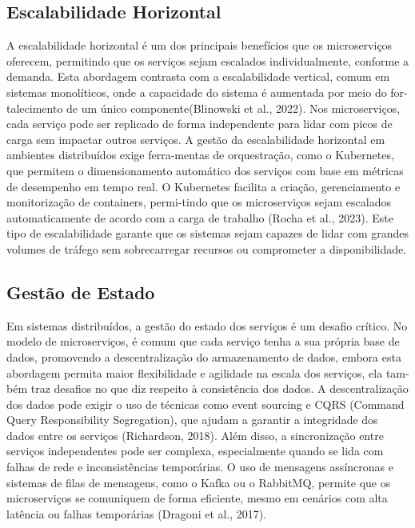 \subsection{Escalabilidade Horizontal}

A escalabilidade horizontal é um dos principais benefícios que os microserviços oferecem, permitindo que os serviços sejam escalados individualmente, conforme a demanda. Esta abordagem contrasta com a escalabilidade vertical, comum em sistemas monolíticos, onde a capacidade do sistema é aumentada por meio do for-talecimento de um único componente(Blinowski et al., 2022). Nos microserviços, cada serviço pode ser replicado de forma independente para lidar com picos de carga sem impactar outros serviços.
A gestão da escalabilidade horizontal em ambientes distribuídos exige ferra-mentas de orquestração, como o Kubernetes, que permitem o dimensionamento automático dos serviços com base em métricas de desempenho em tempo real. O Kubernetes facilita a criação, gerenciamento e monitorização de containers, permi-tindo que os microserviços sejam escalados automaticamente de acordo com a carga de trabalho (Rocha et al., 2023). Este tipo de escalabilidade garante que os sistemas sejam capazes de lidar com grandes volumes de tráfego sem sobrecarregar recursos ou comprometer a disponibilidade.

\subsection{Gestão de Estado}

Em sistemas distribuídos, a gestão do estado dos serviços é um desafio crítico. No modelo de microserviços, é comum que cada serviço tenha a sua própria base de dados, promovendo a descentralização do armazenamento de dados, embora esta abordagem permita maior flexibilidade e agilidade na escala dos serviços, ela tam-bém traz desafios no que diz respeito à consistência dos dados. A descentralização dos dados pode exigir o uso de técnicas como event sourcing e CQRS (Command Query Responsibility Segregation), que ajudam a garantir a integridade dos dados entre os serviços (Richardson, 2018).
Além disso, a sincronização entre serviços independentes pode ser complexa, especialmente quando se lida com falhas de rede e inconsistências temporárias. O uso de mensagens assíncronas e sistemas de filas de mensagens, como o Kafka ou o RabbitMQ, permite que os microserviços se comuniquem de forma eficiente, mesmo em cenários com alta latência ou falhas temporárias (Dragoni et al., 2017).



